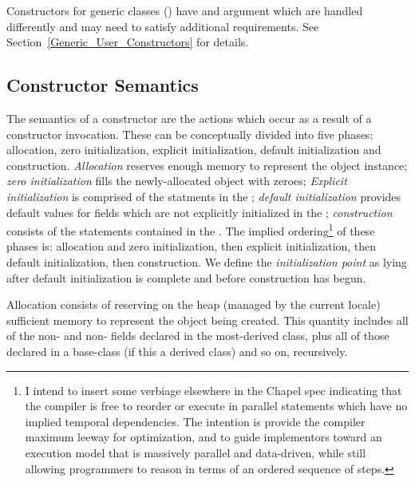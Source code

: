 Constructors for generic classes () have 
and  argument which are handled differently and may need to satisfy
additional requirements. See Section~\ref{Generic_User_Constructors} for
details.  

\subsection{Constructor Semantics}
\label{Constructor_Semantics}

The semantics of a constructor are the actions which occur as a result of a
constructor invocation.  These can be conceptually divided
into five phases: allocation, zero initialization, explicit initialization,
default initialization and
construction.  \emph{Allocation} reserves enough memory to represent the object
instance; \emph{zero initialization} fills the newly-allocated object with
zeroes; \emph{Explicit initialization} is comprised of the statments in
the ; \emph{default initialization} provides
default values for fields which are not explicitly initialized in
the ; \emph{construction} consists of the
statements contained in the .  
The implied ordering\footnote{I intend to insert some verbiage elsewhere in the
Chapel spec indicating that the compiler is free to reorder or execute in
parallel statements which have no implied temporal dependencies.  The intention
is provide the compiler maximum leeway for optimization, and to guide
implementors toward an execution model that is massively parallel and
data-driven, while still allowing programmers to reason in terms of an ordered
sequence of steps.} of these phases is: allocation and zero initialization, then explicit
initialization, then default initialization, then construction.  We define the
\emph{initialization point} as lying after default initialization is complete and
before construction has begun.

Allocation consists of reserving on the heap (managed by the current locale)
sufficient memory to represent the object being created.  This quantity includes
all of the non- and non- fields declared in the
most-derived class, plus all of those declared in a base-class (if this
a derived class) and so on, recursively.


